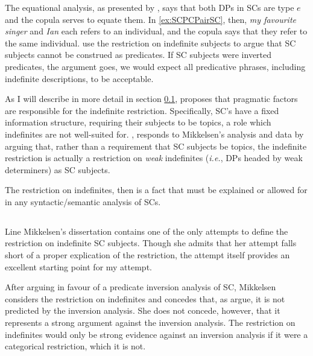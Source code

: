 \documentclass[
	letterpaper,
]{article}
\begin{document}
The equational analysis, as presented by \textcite{heycockkroch1999pseudocleft}, says that both DPs in SCs are type $e$ and the copula serves to equate them.
In \ref{ex:SCPCPairSC}, then, \textit{my favourite singer} and \textit{Ian} each refers to an individual, and the copula says that they refer to the same individual.
\textcite{heycockkroch1999pseudocleft} use the restriction on indefinite subjects to argue that SC subjects cannot be construed as predicates.
If SC subjects were inverted predicates, the argument goes, we would expect all predicative phrases, including indefinite descriptions, to be acceptable.

As I will describe in more detail in section \ref{sec:Mikkelsen}, \textcite{mikkelsen2005copular} proposes that pragmatic factors are responsible for the indefinite restriction.
Specifically, SC's have a fixed information structure, requiring their subjects to be topics, a role which indefinites are not well-suited for.
\textcite{heycock2012specification}, responds to Mikkelsen's analysis and data  by arguing that, rather than a requirement that SC subjects be topics, the indefinite restriction is actually a restriction on \textit{weak} indefinites (\textit{i.e.}, DPs headed by weak determiners) as SC subjects.

The restriction on indefinites, then is a fact that must be explained or allowed for in any syntactic/semantic analysis of SCs.

\subsection{\textcite{mikkelsen2005copular}}\label{sec:Mikkelsen}
Line Mikkelsen's dissertation \parencite[published as][]{mikkelsen2005copular} contains one of the only attempts to define the restriction on indefinite SC subjects.
Though she admits that her attempt falls short of a proper explication of the restriction, the attempt itself provides an excellent starting point for my attempt.

After arguing in favour of a predicate inversion analysis of SC, Mikkelsen considers the restriction on indefinites and concedes that, as \textcite{heycockkroch1999pseudocleft} argue, it is not predicted by the inversion analysis.
She does not concede, however, that it represents a strong argument against the inversion analysis.
The restriction on indefinites would only be strong evidence against an inversion analysis if it were a categorical restriction, which it is not.
\end{document}
